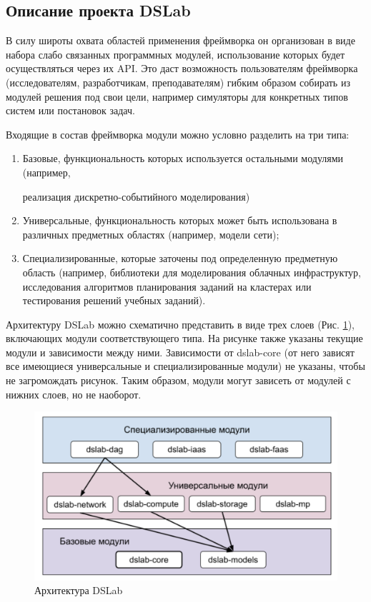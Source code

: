 \subsection{Описание проекта DSLab}

В силу широты охвата областей применения фреймворка он организован в виде набора слабо связанных программных модулей, использование которых будет осуществляться через их API. Это даст возможность пользователям фреймворка (исследователям, разработчикам, преподавателям) гибким образом собирать из модулей решения под свои цели, например симуляторы для конкретных типов систем или постановок задач.

Входящие в состав фреймворка модули можно условно разделить на три типа:
\begin{enumerate}
    \item 
    Базовые, функциональность которых используется остальными модулями (например, 
    
    реализация дискретно-событийного моделирования)
    \item
    Универсальные, функциональность которых может быть использована в различных предметных областях (например, модели сети);
    \item
    Специализированные, которые заточены под определенную предметную область (например, библиотеки для моделирования облачных инфраструктур, исследования алгоритмов планирования заданий на кластерах или тестирования решений учебных заданий).
\end{enumerate}

Архитектуру DSLab можно схематично представить в виде трех слоев (Рис. \ref{dslab_arc}), включающих модули соответствующего типа. На рисунке также указаны текущие модули и зависимости между ними. Зависимости от dslab-core (от него зависят все имеющиеся универсальные и специализированные модули) не указаны, чтобы не загромождать рисунок. Таким образом, модули могут зависеть от модулей с нижних слоев, но не наоборот.

\begin{figure}[H]
    \centering
    \includegraphics[width=0.7\linewidth]{images/dslab_arc.png}
    \caption{Архитектура DSLab}
    \label{dslab_arc}
\end{figure}

